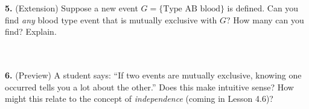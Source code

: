 \documentclass[10pt]{article}
\begin{document}
\begin{practicebox}
\tcbbreak
\vspace{8pt}
\textbf{5.} (Extension) Suppose a new event $G = \{\text{Type AB blood}\}$ is defined.
Can you find \emph{any} blood type event that is mutually exclusive with $G$?
How many can you find? Explain.\\
\writeline\\[1pt]\writeline\\[1pt]\writeline

\vspace{8pt}
\textbf{6.} (Preview) A student says: ``If two events are mutually exclusive, knowing
one occurred tells you a lot about the other.'' Does this make intuitive sense?
How might this relate to the concept of \emph{independence} (coming in Lesson 4.6)?\\
\writeline\\[1pt]\writeline\\[1pt]\writeline
\end{practicebox}
\end{document}

